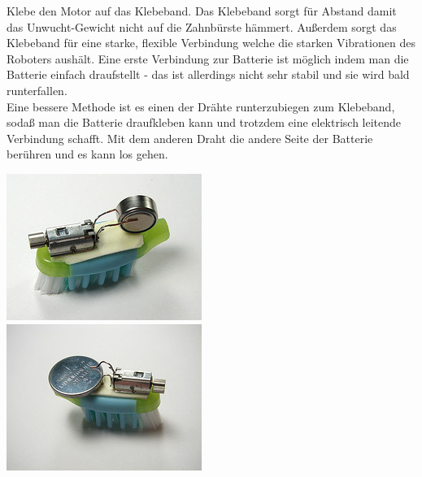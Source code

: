 \documentclass[10pt,a4paper,ngerman,twoside]{article} %
\begin{document}
\begin{multicols}{3}
Klebe den Motor auf das Klebeband. Das Klebeband sorgt für Abstand damit das Unwucht-Gewicht nicht auf die Zahnbürste hämmert. Außerdem sorgt das Klebeband für eine starke, flexible Verbindung welche die starken Vibrationen des Roboters aushält. Eine erste Verbindung zur Batterie ist möglich indem man die Batterie einfach draufstellt - das ist allerdings nicht sehr stabil und sie wird bald runterfallen.
\\ 

Eine bessere Methode ist es einen der Drähte runterzubiegen zum Klebeband, sodaß man die Batterie draufkleben kann und trotzdem eine elektrisch leitende Verbindung schafft. Mit dem anderen Draht die andere Seite der Batterie berühren und es kann los gehen. \\

\begin{center}
\includegraphics[width=\linewidth]{bristlebot/bristlebot11.jpg}\\
\includegraphics[width=\linewidth]{bristlebot/bristlebot13.jpg}\\

\end{center}
\end{multicols}
\end{document}
